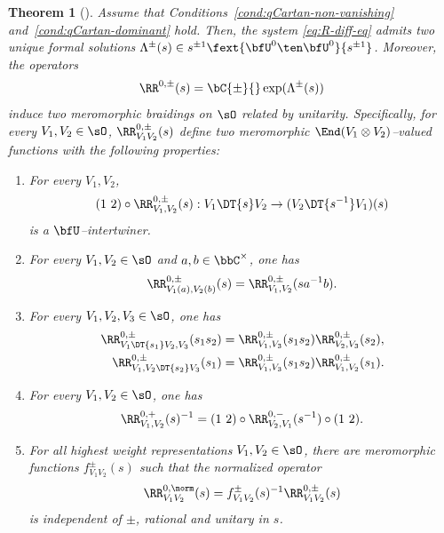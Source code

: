 \documentclass[reqno]{amsart}
\numberwithin{equation}{section}
\newtheorem*{theorem}{Theorem}
\begin{document}
\begin{theorem}[\cite{appel-gautam-26}]\label{thm:appel-gautam-26}
Assume that Conditions~\ref{cond:qCartan-non-vanishing}
and~\ref{cond:qCartan-dominant} hold.
Then, the system \eqref{eq:R-diff-eq} admits two unique formal solutions $\Lambda^{\pm}(s)\in s^{\pm1}\fext{\bfU^0\ten\bfU^0}{s^{\pm1}}$. Moreover, the operators
\begin{equation}
\RR^{0,\pm}(s)=\bC{\pm}{}\exp(\Lambda^{\pm}(s))
\end{equation}
induce two meromorphic braidings on $\sO$ related by unitarity.
Specifically, for every $V_1,V_2\in\sO$, $\RR_{V_1V_2}^{0,\pm}(s)$
define two meromorphic $\End(V_1\otimes V_2)$--valued functions
with the following properties:
\begin{enumerate}[font=\upshape]\itemsep0.25cm
	\item\label{R0:int} For every $V_1,V_2$,
	\[
	(1\ 2) \circ \RR^{0,\pm}_{V_1,V_2}(s) : V_1\DT{s} V_2 \to
	(V_2\DT{s^{-1}}V_1)(s)
	\]
	is a $\bfU$--intertwiner.
	\item\label{R0:shift} For every $V_1,V_2\in\sO$
	and $a,b\in\bbC^\times$, one has
	\[
	\RR^{0,\pm}_{V_1(a),V_2(b)}(s) = \RR^{0,\pm}_{V_1,V_2}(sa^{-1}b).
	\]
	\item\label{R0:cabling} For every $V_1,V_2,V_3\in\sO$, one has
	\[
	\begin{aligned}
		\RR^{0,\pm}_{V_1\DT{s_1}V_2,V_3}(s_1s_2) &= \RR^{0,\pm}_{V_1,V_3}(s_1s_2)
		\RR^{0,\pm}_{V_2,V_3}(s_2), \\
		\RR^{0,\pm}_{V_1,V_2\DT{s_2}V_3}(s_1) &= \RR^{0,\pm}_{V_1,V_3}(s_1s_2)
		\RR^{0,\pm}_{V_1,V_2}(s_1).
	\end{aligned}
	\]
	\item\label{R0:unitary} For every $V_1,V_2\in\sO$, one has
	\[
	\RR^{0,+}_{V_1,V_2}(s)^{-1} = (1\ 2)\circ
	\RR^{0,-}_{V_2,V_1}(s^{-1})\circ (1\ 2).
	\]
	\item\label{R0:rat} For all highest weight representations $V_1,V_2\in\sO$, there are meromorphic functions $f^{\pm}_{V_1V_2}(s)$ such that the normalized operator
	\[
	\RR^{0,\norm}_{V_1V_2}(s)=f^{\pm}_{V_1V_2}(s)^{-1}\RR^{0,\pm}_{V_1V_2}(s)
	\]
	is independent of $\pm$, rational and unitary in $s$.
\end{enumerate}
\end{theorem}
\end{document}
